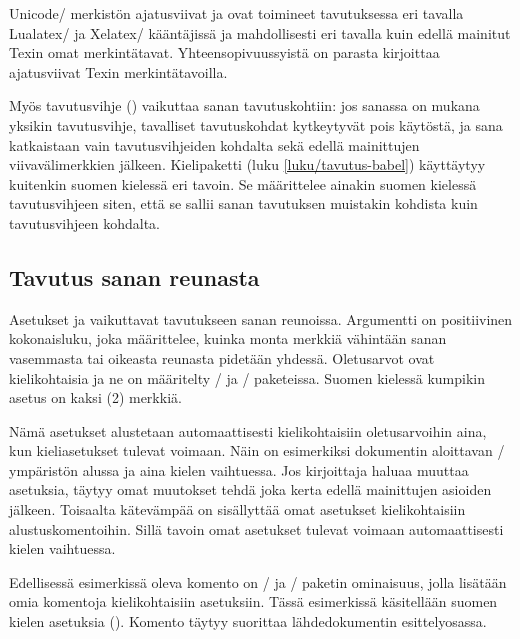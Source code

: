 Unicode\-/ merkistön ajatusviivat  ja
 ovat toimineet tavutuksessa eri tavalla
Lualatex\-/{} ja Xelatex\-/ kääntäjissä ja mahdollisesti eri tavalla
kuin edellä mainitut Texin omat merkintätavat. Yhteensopivuussyistä on
parasta kirjoittaa ajatusviivat Texin merkintätavoilla.

Myös tavutusvihje (\komento{-}) vaikuttaa sanan tavutuskohtiin: jos
sanassa on mukana yksikin tavutusvihje, tavalliset tavutuskohdat
kytkeytyvät pois käytöstä, ja sana katkaistaan vain tavutusvihjeiden
kohdalta sekä edellä mainittujen viivavälimerkkien jälkeen. Kielipaketti
 (luku \ref{luku/tavutus-babel}) käyttäytyy kuitenkin
suomen kielessä eri tavoin. Se määrittelee ainakin suomen kielessä
tavutusvihjeen siten, että se sallii sanan tavutuksen muistakin kohdista
kuin tavutusvihjeen kohdalta.

\subsection{Tavutus sanan reunasta}
\label{luku/tavutus-reunasta}

Asetukset  ja
 vaikuttavat tavutukseen sanan
reunoissa. Argumentti  on positiivinen kokonaisluku, joka
määrittelee, kuinka monta merkkiä vähintään sanan vasemmasta tai
oikeasta reunasta pidetään yhdessä. Oletusarvot ovat kielikohtaisia ja
ne on määritelty \-/{} ja \-/
paketeissa. Suomen kielessä kumpikin asetus on kaksi (2) merkkiä.

Nämä asetukset alustetaan automaattisesti kielikohtaisiin oletusarvoihin
aina, kun kieliasetukset tulevat voimaan. Näin on esimerkiksi dokumentin
aloittavan \-/ ympäristön alussa ja aina kielen
vaihtuessa. Jos kirjoittaja haluaa muuttaa asetuksia, täytyy omat
muutokset tehdä joka kerta edellä mainittujen asioiden jälkeen.
Toisaalta kätevämpää on sisällyttää omat asetukset kielikohtaisiin
alustuskomentoihin. Sillä tavoin omat asetukset tulevat voimaan
automaattisesti kielen vaihtuessa.

\begin{koodilohkosis}
\end{koodilohkosis}

\noindent
Edellisessä esimerkissä oleva komento  on
\-/{} ja \-/ paketin ominaisuus,
jolla lisätään omia komentoja kielikohtaisiin asetuksiin. Tässä
esimerkissä käsitellään suomen kielen asetuksia
(). Komento täytyy suorittaa lähdedokumentin
esittelyosassa.

